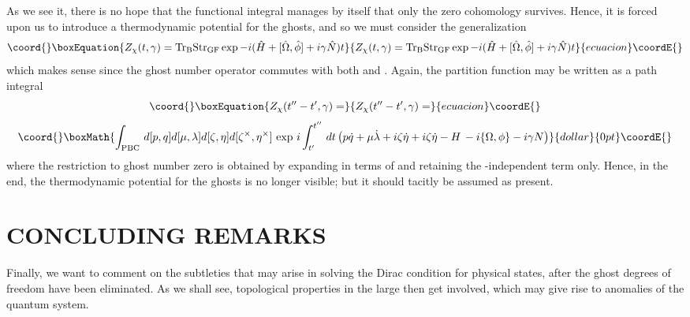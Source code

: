 \documentclass[a4paper,10pt]{article}
\begin{document}
As we see it, there is no hope that the functional integral manages by itself that only 
the zero cohomology survives. Hence, it is forced upon us to introduce a thermodynamic 
potential \coordHE{} for the ghosts, and so we must consider the 
generalization
\begin{equation}\coord{}\boxEquation{
Z_{\chi}(t,\gamma)=\mathrm{Tr}_{\mathrm{B}}\mathrm{Str}_{\mathrm{GF}}\exp -
i(\hat{H}+[\hat{\Omega},\hat{\phi}]+i\gamma\hat{N})t
}{
Z_{\chi}(t,\gamma)=\mathrm{Tr}_{\mathrm{B}}\mathrm{Str}_{\mathrm{GF}}\exp -
i(\hat{H}+[\hat{\Omega},\hat{\phi}]+i\gamma\hat{N})t
}{ecuacion}\coordE{}\end{equation}
which makes sense since the ghost number operator commutes with both \coordHE{} and 
\myHighlight{$[\hat{\Omega},\hat{\phi}]$}\coordHE{}. Again, the partition function may be written as a path 
integral
\begin{equation}\coord{}\boxEquation{
Z_{\chi}(t^{\prime\prime}-t^{\prime},\gamma)=
}{
Z_{\chi}(t^{\prime\prime}-t^{\prime},\gamma)=
}{ecuacion}\coordE{}\end{equation}
$$\coord{}\boxMath{\int_{\mathrm{PBC}}\,d[p,q]d[\mu,\lambda]d[\zeta,\eta]
d[\zeta^{\times},\eta^{\times}]\,
\exp\,i\int_{t^{\prime}}^{t^{\prime\prime}}\,dt\left(p\dot{q}+\mu
\dot{\lambda}+i\zeta\dot{\eta}+i\zeta
\dot{\eta}-H\,-i\{\Omega,\phi\}-i\gamma N\right)}{dollar}{0pt}\coordE{}$$
where the restriction to ghost number zero is obtained by expanding in terms of \myHighlight{$\gamma$}\coordHE{} 
and retaining the \myHighlight{$\gamma$}\coordHE{}-independent term only. Hence, in the end, the thermodynamic  
potential for the ghosts is no longer visible; but it should tacitly be assumed as 
present.

\section{CONCLUDING REMARKS}

Finally, we want to comment on the subtleties that may arise in solving the Dirac 
condition for physical states, after the ghost degrees of freedom have been eliminated. 
As we shall see, topological properties in the large then get involved, which may give rise 
to anomalies of the quantum system.
\end{document}
